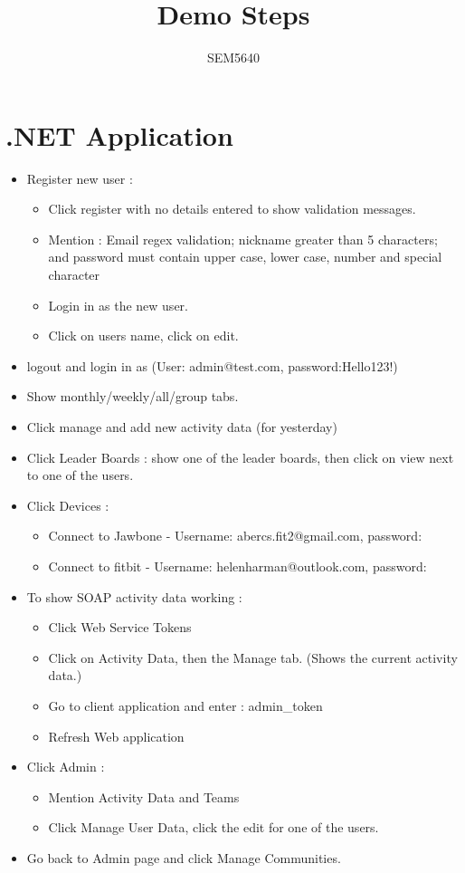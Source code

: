 \documentclass[10pt,a4paper]{report}
\author{SEM5640 }
\title{Demo Steps}
\begin{document}
\section*{.NET Application}
\begin{itemize}
\item Register new user :
	\begin{itemize}
	\item Click register with no details entered to show validation messages.
	\item Mention : Email regex validation; nickname greater than 5 characters; and password must contain upper case, lower case, number and special character
	\item Login in as the new user. 
	\item Click on users name, click on edit.
	\end{itemize}
\item logout and login in as (User: admin@test.com, password:Hello123!)
\item Show monthly/weekly/all/group tabs.
\item Click manage and add new activity data (for yesterday) 
\item Click Leader Boards : show one of the leader boards, then click on view next to one of the users.
\item Click Devices :
	\begin{itemize}
	\item Connect to Jawbone - Username: abercs.fit2@gmail.com, password:                  
	\item Connect to fitbit - Username: helenharman@outlook.com, password:                 
	\end{itemize}
\item To show SOAP activity data working :
	\begin{itemize}
	\item Click Web Service Tokens
	\item Click on Activity Data, then the Manage tab. (Shows the current activity data.)
	\item Go to client application and enter : admin\_token
	\item Refresh Web application 
	\end{itemize}
\item Click Admin :
	\begin{itemize}
	\item Mention Activity Data and Teams
	\item Click Manage User Data, click the edit for one of the users.
	\end{itemize}
\item Go back to Admin page and click Manage Communities.
\end{itemize}
\pagebreak
\end{document}
